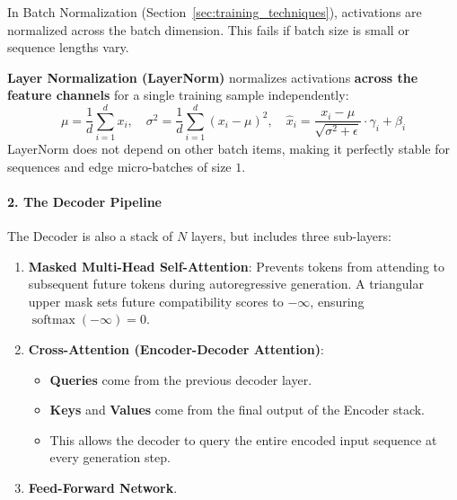 \begin{keyidea}
In Batch Normalization (Section~\ref{sec:training_techniques}), activations are normalized across the batch dimension. This fails if batch size is small or sequence lengths vary. 

\textbf{Layer Normalization (LayerNorm)} normalizes activations \textbf{across the feature channels} for a single training sample independently:
\begin{equation}
\mu = \frac{1}{d} \sum_{i=1}^d x_i, \quad \sigma^2 = \frac{1}{d} \sum_{i=1}^d (x_i - \mu)^2, \quad \hat{x}_i = \frac{x_i - \mu}{\sqrt{\sigma^2 + \epsilon}} \cdot \gamma_i + \beta_i\label{eq:layernorm}
\end{equation}
LayerNorm does not depend on other batch items, making it perfectly stable for sequences and edge micro-batches of size $1$.
\end{keyidea}

\paragraph{2. The Decoder Pipeline}
The Decoder is also a stack of $N$ layers, but includes three sub-layers:
\begin{enumerate}
    \item \textbf{Masked Multi-Head Self-Attention}: Prevents tokens from attending to subsequent future tokens during autoregressive generation. A triangular upper mask sets future compatibility scores to $-\infty$, ensuring $\operatorname{softmax}(-\infty) = 0$.
    \item \textbf{Cross-Attention (Encoder-Decoder Attention)}:
    \begin{itemize}
        \item \textbf{Queries} come from the previous decoder layer.
        \item \textbf{Keys} and \textbf{Values} come from the final output of the Encoder stack.
        \item This allows the decoder to query the entire encoded input sequence at every generation step.
    \end{itemize}
    \item \textbf{Feed-Forward Network}.
\end{enumerate}

